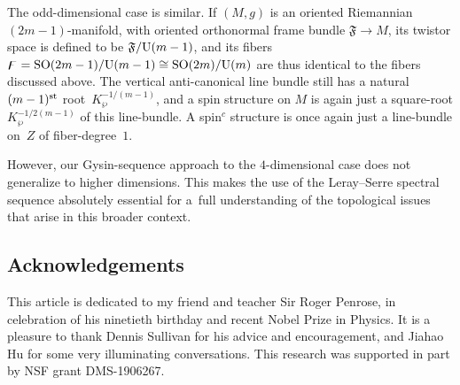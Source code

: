 \documentclass[pdftex]{sigma}
\numberwithin{equation}{section}
\begin{document}
The odd-dimensional case is similar. If $(M,g)$ is an oriented Riemannian $(2m-1)$-manifold, with oriented orthonormal
frame bundle $\mathfrak{F}\to M$, its twistor space is defined to be $\mathfrak{F}/{\rm U}(m-1)$, and its fibers ${\digamma}= {\rm SO}(2m-1)/{\rm U}(m-1)\cong {\rm SO}(2m)/{\rm U}(m)$ are thus
identical to the fibers discussed above. The vertical anti-canonical line bundle still has a natural $(m-1)^{\rm st}$ root~$K^{-1/(m-1)}_\wp$, and a spin structure on $M$ is again just a square-root $K^{-1/2(m-1)}_\wp$ of this line-bundle.
A spin$^c$ structure is once again just
a line-bundle on~$Z$ of fiber-degree~$1$.

However, our Gysin-sequence approach to the $4$-dimensional case does not generalize to higher dimensions. This makes the use of the Leray--Serre spectral sequence absolutely essential for a~full understanding of the topological issues that arise in this broader context.

\vspace{-1mm}

\subsection*{Acknowledgements}
 This article is dedicated to my friend and teacher Sir Roger Penrose, in celebration of
his ninetieth birthday and recent Nobel Prize in Physics.
It is a pleasure to thank Dennis Sullivan for
his advice and encouragement, and Jiahao Hu for some very illuminating conversations. This research was supported in part by NSF grant DMS-1906267.

\vspace{-1mm}
\end{document}
